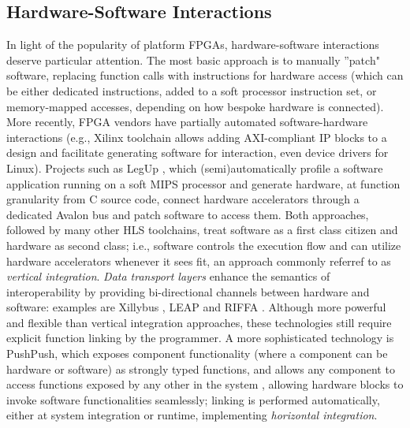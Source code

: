 \subsection{Hardware-Software Interactions}
\par In light of the popularity of platform FPGAs, hardware-software interactions deserve particular attention. The most basic approach is to manually ''patch" software, replacing function calls with instructions for hardware access (which can be either dedicated instructions, added to a soft processor instruction set, or memory-mapped accesses, depending on how bespoke hardware is connected). More recently, FPGA vendors have partially automated software-hardware interactions (e.g., Xilinx toolchain allows adding AXI-compliant IP blocks to a design and facilitate generating software for interaction, even device drivers for Linux). Projects such as LegUp \cite{canis2011legup}, which (semi)automatically profile a software application running on a soft MIPS processor and generate hardware, at function granularity from C source code, connect hardware accelerators through a dedicated Avalon bus and patch software to access them. Both approaches, followed by many other HLS toolchains, treat software as a first class citizen and hardware as second class; i.e., software controls the execution flow and can utilize hardware accelerators whenever it sees fit, an approach commonly referref to as \textit{vertical integration}. \textit{Data transport layers} enhance the semantics of interoperability by providing bi-directional channels between hardware and software: examples are Xillybus \cite{Xilly}, LEAP \cite{adler2011leap} and RIFFA \cite{jacobsen2015riffa}. Although more powerful and flexible than vertical integration approaches, these technologies still require explicit function linking by the programmer. A more sophisticated technology is PushPush, which exposes component functionality (where a component can be hardware or software) as  strongly  typed functions, and allows any component to access functions exposed by any other in the system \cite{7294024}, allowing hardware blocks to invoke software functionalities seamlessly; linking is performed automatically, either at system integration or runtime, implementing \textit{horizontal integration}.

